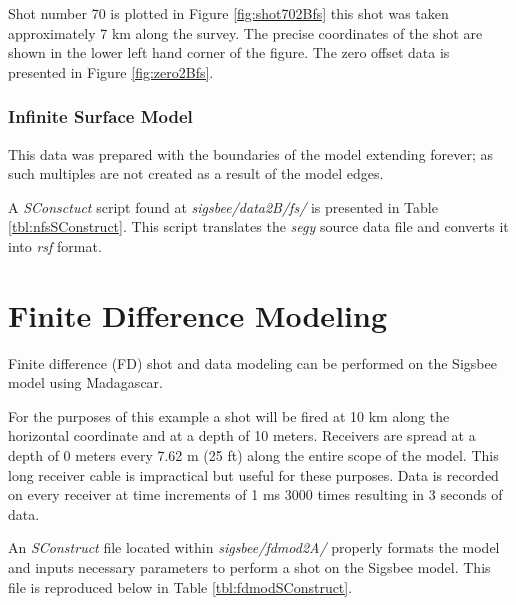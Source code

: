 Shot number 70 is plotted in Figure \ref{fig:shot702Bfs} this shot was taken approximately 7 km along the survey.  The precise coordinates
of the shot are shown in the lower left hand corner of the figure.  The zero offset data is presented in Figure \ref{fig:zero2Bfs}.     


\subsubsection{Infinite Surface Model}
This data was prepared with the boundaries of the model extending forever; as such multiples are not created as a  result of the model edges.  

A \emph{SConsctuct} script found at \textit{sigsbee/data2B/fs/} is presented in Table \ref{tbl:nfsSConstruct}.  This script 
translates the \emph{segy} source data file and converts it into \emph{rsf} format.  

{
\tiny

\normalsize
}



\section{Finite Difference Modeling}
Finite difference (FD) shot and data modeling can be performed on the Sigsbee model using Madagascar.  

For the purposes of this example a shot will be fired at 10 km along the horizontal coordinate and at a depth of 10 meters.  Receivers are
spread at a depth of 0 meters every 7.62 m (25 ft) along the entire scope of the model.  This long receiver cable is impractical but useful for these
purposes.  Data is recorded on every receiver at time increments of 1 ms 3000 times resulting in 3 seconds of data.

An \emph{SConstruct} file located within \emph{sigsbee/fdmod2A/} properly formats the model and inputs necessary parameters to perform a shot on
the Sigsbee model.  This file is reproduced below in Table \ref{tbl:fdmodSConstruct}.

